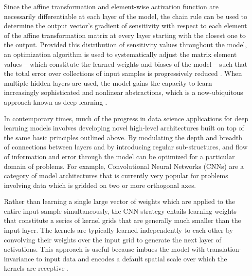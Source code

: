 \documentclass[12pt]{article}
\begin{document}
Since the affine transformation and element-wise activation function are necessarily differentiable at each layer of the model, the chain rule can be used to determine the output vector's gradient of sensitivity with respect to each element of the affine transformation matrix at every layer starting with the closest one to the output. Provided this distribution of sensitivity values throughout the model, an optimization algorithm is used to systematically adjust the matrix element values -- which constitute the learned weights and biases of the model -- such that the total error over collections of input samples is progressively reduced \cite{russell_artificial_2010}\cite{srivastava_highway_2015}. When multiple hidden layers are used, the model gains the capacity to learn increasingly sophisticated and nonlinear abstractions, which is a now-ubiquitous approach known as deep learning \cite{lecun_deep_2015}.

In contemporary times, much of the progress in data science applications for deep learning models involves developing novel high-level architectures built on top of the same basic principles outlined above. By modulating the depth and breadth of connections between layers and by introducing regular sub-structures, and flow of information and error through the model can be optimized for a particular domain of problems. For example, Convolutional Neural Networks (CNNs) are a category of model architectures that is currently very popular for problems involving data which is gridded on two or more orthogonal axes.

Rather than learning a single large vector of weights which are applied to the entire input sample simultaneously, the CNN strategy entails learning weights that constitute a series of kernel grids that are generally much smaller than the input layer. The kernels are typically learned independently to each other by convolving their weights over the input grid to generate the next layer of activations. This approach is useful because imbues the model with translation-invariance to input data and encodes a default spatial scale over which the kernels are receptive \cite{lecun_gradient-based_1998}.
\end{document}
